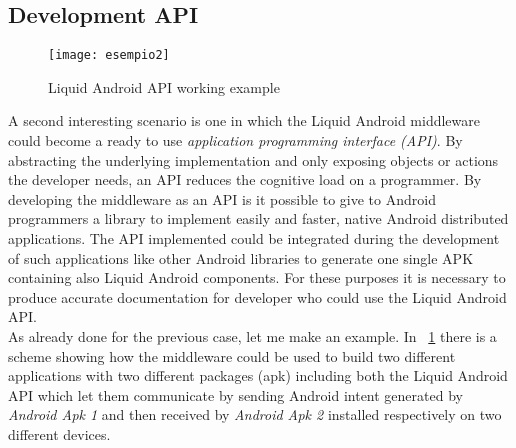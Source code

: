 \subsection{Development API}\label{devAPI}
\begin{figure}[h!]
	\centering
	\texttt{[image: esempio2]}
	\caption{Liquid Android API working example}
	\label{fig:3.4}
\end{figure}
 A second interesting scenario is one in which the Liquid Android middleware could become a ready to use \textit{application programming interface (API)}. By abstracting the underlying implementation and only exposing objects or actions the developer needs, an API reduces the cognitive load on a programmer. By developing the middleware as an API is it possible to give to Android programmers a library to implement easily and faster, native Android distributed applications. The API implemented could be integrated during the development of such applications like other Android libraries to generate one single APK containing also Liquid Android components. For these purposes it is necessary to produce accurate documentation for developer who could use the Liquid Android API.\\
As already done for the previous case, let me make an example.
In \figurename~\ref{fig:3.4} there is a scheme showing how the middleware could be used to build two different applications with two different packages (apk) including both the Liquid Android API which let them communicate by sending Android intent generated by \textit{Android Apk 1} and then received by \textit{Android Apk 2} installed respectively on two different devices.

